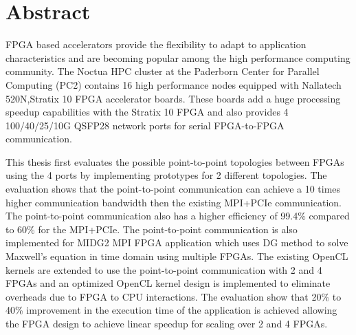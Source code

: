 \chapter{Abstract}


FPGA based accelerators provide the flexibility to adapt to application characteristics and are becoming popular among the high performance computing community. The Noctua HPC cluster at the Paderborn Center for Parallel Computing (PC2) contains 16 high performance nodes equipped with Nallatech 520N,Stratix 10 FPGA accelerator boards. These boards add a huge processing speedup capabilities with the Stratix 10 FPGA and also provides 4 100/40/25/10G QSFP28 network ports for serial FPGA-to-FPGA communication.

This thesis first evaluates the possible point-to-point topologies between FPGAs using the 4 ports by implementing prototypes for 2 different topologies.
The evaluation shows that the point-to-point communication can achieve a 10 times higher communication bandwidth then the existing MPI+PCIe communication.
The point-to-point communication also has a higher efficiency of 99.4\% compared to 60\% for the MPI+PCIe. The point-to-point communication is also implemented for MIDG2 MPI FPGA application which uses DG method to solve Maxwell’s equation in time domain
using multiple FPGAs. The existing OpenCL kernels are extended to use the point-to-point communication with 2 and 4 FPGAs and an optimized OpenCL kernel design is implemented to eliminate overheads due to FPGA to CPU interactions. The evaluation show that 20\% to 40\% improvement in the execution time of the application is achieved allowing the FPGA design to achieve linear speedup for scaling over 2 and 4 FPGAs.


